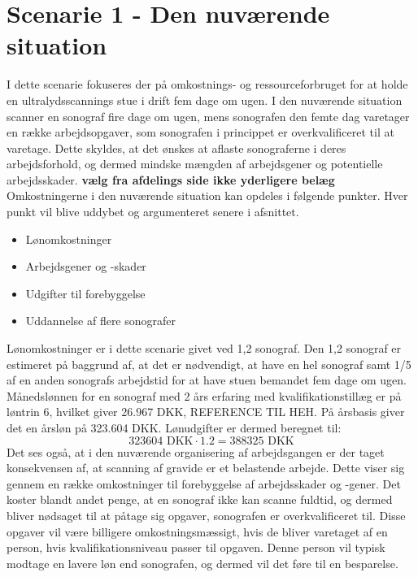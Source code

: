 \section{Scenarie 1 - Den nuværende situation}
I dette scenarie fokuseres der på omkostnings- og ressourceforbruget for at holde en ultralydsscannings stue i drift fem dage om ugen. I den nuværende situation scanner en sonograf fire dage om ugen, mens sonografen den femte dag varetager en række arbejdsopgaver, som sonografen i princippet er overkvalificeret til at varetage. Dette skyldes, at det ønskes at aflaste sonograferne i deres arbejdsforhold, og dermed mindske mængden af arbejdsgener og potentielle arbejdsskader. \textbf{vælg fra afdelings side ikke yderligere belæg} \\
Omkostningerne i den nuværende situation kan opdeles i følgende punkter. Hver punkt vil blive uddybet og argumenteret senere i afsnittet. 
\begin{itemize}
\item Lønomkostninger
\item Arbejdsgener og -skader
\item Udgifter til forebyggelse
\item Uddannelse af flere sonografer
\end{itemize}
Lønomkostninger er i dette scenarie givet ved 1,2 sonograf. Den 1,2 sonograf er estimeret på baggrund af, at det er nødvendigt, at have en hel sonograf samt 1/5 af en anden sonografs arbejdstid for at have stuen bemandet fem dage om ugen. Månedslønnen for en sonograf med 2 års erfaring med kvalifikationstillæg er på løntrin 6, hvilket giver 26.967 DKK, REFERENCE TIL HEH. På årsbasis giver det en årsløn på 323.604 DKK. Lønudgifter er dermed beregnet til:
\begin{equation}
323604 \text{ DKK}\cdot1.2 = 388325 \text{ DKK}
\end{equation}
Det ses også, at i den nuværende organisering af arbejdsgangen er der taget konsekvensen af, at scanning af gravide er et belastende arbejde. Dette viser sig gennem en række omkostninger til forebyggelse af arbejdsskader og -gener. Det koster blandt andet penge, at en sonograf ikke kan scanne fuldtid, og dermed bliver nødsaget til at påtage sig opgaver, sonografen er overkvalificeret til. Disse opgaver vil være billigere omkostningsmæssigt, hvis de bliver varetaget af en person, hvis kvalifikationsniveau passer til opgaven. Denne person vil typisk modtage en lavere løn end sonografen, og dermed vil det føre til en besparelse. 

